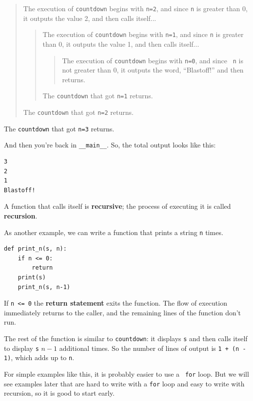 \documentclass[10pt]{book}
\begin{document}
\begin{quote}
The execution of {\tt countdown} begins with {\tt n=2}, and since
{\tt n} is greater than 0, it outputs the value 2, and then calls itself...

\begin{quote}
The execution of {\tt countdown} begins with {\tt n=1}, and since
{\tt n} is greater than 0, it outputs the value 1, and then calls itself...

\begin{quote}
The execution of {\tt countdown} begins with {\tt n=0}, and since {\tt
n} is not greater than 0, it outputs the word, ``Blastoff!'' and then
returns.
\end{quote}

The {\tt countdown} that got {\tt n=1} returns.
\end{quote}

The {\tt countdown} that got {\tt n=2} returns.
\end{quote}

The {\tt countdown} that got {\tt n=3} returns.

And then you're back in \verb"__main__".  So, the
total output looks like this:

\begin{verbatim}
3
2
1
Blastoff!
\end{verbatim}
%
A function that calls itself is {\bf recursive}; the process of
executing it is called {\bf recursion}.

As another example, we can write a function that prints a
string {\tt n} times.

\begin{verbatim}
def print_n(s, n):
    if n <= 0:
        return
    print(s)
    print_n(s, n-1)
\end{verbatim}
%
If {\tt n <= 0} the {\bf return statement} exits the function.  The
flow of execution immediately returns to the caller, and the remaining
lines of the function don't run.

The rest of the function is similar to {\tt countdown}: it displays
{\tt s} and then calls itself to display {\tt s} $n-1$ additional
times.  So the number of lines of output is {\tt 1 + (n - 1)}, which
adds up to {\tt n}.

For simple examples like this, it is probably easier to use a {\tt
for} loop.  But we will see examples later that are hard to write
with a {\tt for} loop and easy to write with recursion, so it is
good to start early.
\end{document}
